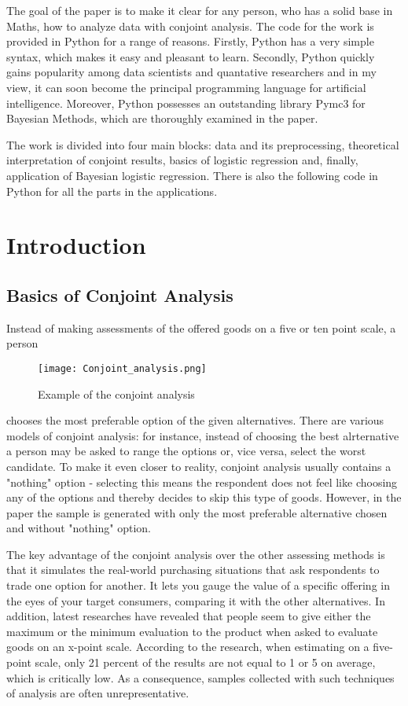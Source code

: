 \documentclass[a4paper, 12pt]{extreport}
\begin{document}
The goal of the paper is to make it clear for any person, who has a solid base in Maths, how to analyze data with conjoint analysis. The code for the work is provided in Python for a range of reasons.
Firstly, Python has a very simple syntax, which makes it easy and pleasant to learn. Secondly, Python quickly gains popularity among data scientists and quantative researchers and in my view, it can
soon become the principal programming language for artificial intelligence. Moreover, Python possesses an outstanding library Pymc3 for Bayesian Methods, which are thoroughly examined in the paper.

The work is divided into four main blocks: data and its preprocessing, theoretical interpretation of conjoint results, basics of logistic regression and, finally, application of Bayesian logistic regression. There is also
the following code in Python for all the parts in the applications.

\section{Introduction}

\subsection{Basics of Conjoint Analysis}


Instead of making assessments of the offered goods on a five or ten point scale, a person
\begin{wrapfigure}{r}{0.5\textwidth}
   \centering
   \texttt{[image: Conjoint\_analysis.png]}
   \caption{Example of the conjoint analysis}
\end{wrapfigure}
chooses the most preferable option of the given alternatives. There are various models of conjoint analysis: for instance, instead of choosing the best alrternative a person may be asked to range the options or, vice versa, select the worst candidate. To make it even closer to reality, conjoint analysis
usually contains a "nothing" option - selecting this means the respondent does not feel like choosing any of the options and thereby decides to skip this type of goods. However, in the paper the
sample is generated with only the most preferable alternative chosen and without "nothing" option.

The key advantage of the conjoint analysis over the other assessing methods is that it simulates the real-world purchasing situations that ask respondents to trade one option for another.
It lets you gauge the value of a specific offering in the eyes of your target consumers, comparing it with the other alternatives.
In addition, latest researches have revealed that people
seem to give either the maximum or the minimum evaluation to the product when asked to evaluate goods on an x-point scale. According to the research, when estimating on a five-point scale,
only 21 percent of the results are not equal to 1 or 5 on average, which is critically low. As a consequence, samples collected with such techniques of analysis are often unrepresentative. %
\end{document}
